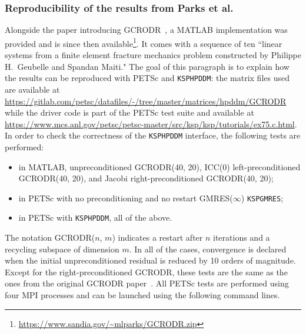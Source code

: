 \documentclass[3p,11pt]{elsarticle}
\newcommand{\pk}[1]{\texttt{#1}}
\begin{document}
    \subsubsection{Reproducibility of the results from Parks et
    al.~\cite{parks2006recycling}}
Alongside the paper introducing GCRODR~\cite{parks2006recycling},
a MATLAB implementation was provided and is since then
available\footnote{\url{https://www.sandia.gov/~mlparks/GCRODR.zip}}. It comes
with a sequence of ten ``linear systems from a finite element fracture mechanics
problem constructed by Philippe H.\ Geubelle and Spandan Maiti." The goal of
this paragraph is to explain how the results can be reproduced with PETSc and \pk{KSPHPDDM}: the matrix files used are available at
\url{https://gitlab.com/petsc/datafiles/-/tree/master/matrices/hpddm/GCRODR}
while the driver code is part of the PETSc test suite and available at
\url{https://www.mcs.anl.gov/petsc/petsc-master/src/ksp/ksp/tutorials/ex75.c.html}. In order to check the correctness of the \pk{KSPHPDDM} interface,
the following tests are performed:
\begin{itemize}
    \item in MATLAB, unpreconditioned GCRODR(40, 20), ICC(0) left-preconditioned
        GCRODR(40, 20), and Jacobi right-preconditioned GCRODR(40, 20);
    \item in PETSc with no preconditioning and no restart GMRES($\infty$) \pk{KSPGMRES};
    \item in PETSc with \pk{KSPHPDDM}, all of the above.
\end{itemize}
The notation GCRODR($n$, $m$) indicates a restart after $n$ iterations and a recycling subspace of dimension $m$.
In all of the cases, convergence is declared when the initial unpreconditioned
residual is reduced by 10 orders of magnitude.
Except for the right-preconditioned GCRODR, these tests are the same as the
ones from the original GCRODR paper~\cite{parks2006recycling}.
All PETSc tests are performed using four MPI
processes and can be launched using the following command lines. \\[-4pt]
\end{document}

